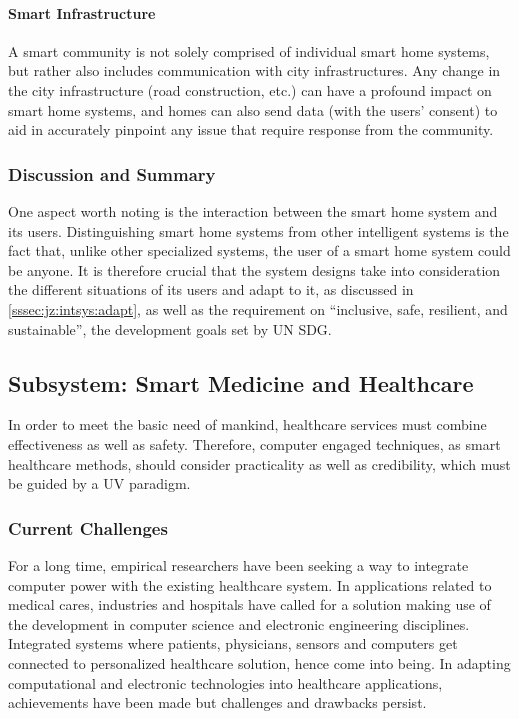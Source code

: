 \documentclass[letterpaper, twocolumn, 10pt, conference]{IEEEtran}
\begin{document}
\paragraph{Smart Infrastructure}

A smart community is not solely comprised of individual smart home systems, but rather also includes communication with city infrastructures. Any change in the city infrastructure (road construction, etc.) can have a profound impact on smart home systems, and homes can also send data (with the users' consent) to aid in accurately pinpoint any issue that require response from the community.

\subsubsection{Discussion and Summary}
\label{sssec:zcy:smart_home:discussion}

One aspect worth noting is the interaction between the smart home system and its users. Distinguishing smart home systems from other intelligent systems is the fact that, unlike other specialized systems, the user of a smart home system could be anyone. It is therefore crucial that the system designs take into consideration the different situations of its users and adapt to it, as discussed in \ref{sssec:jz:intsys:adapt}, as well as the requirement on \enquote{inclusive, safe, resilient, and sustainable}, the development goals set by UN SDG.



\subsection{Subsystem: Smart Medicine and Healthcare}
\label{ssec:cgh:smart_health}

In order to meet the basic need of mankind, healthcare services must combine effectiveness as well as safety. Therefore, computer engaged techniques, as smart healthcare methods, should consider practicality as well as credibility, which must be guided by a UV paradigm. 


\subsubsection{Current Challenges}
\label{sssec:cgh:smart_health:challenges}

For a long time, empirical researchers have been seeking a way to integrate computer power with the existing healthcare system. In applications related to medical cares, industries and hospitals have called for a solution making use of the development in computer science and electronic engineering disciplines. Integrated systems where patients, physicians, sensors and computers get connected to personalized healthcare solution, hence come into being. In adapting computational and electronic technologies into healthcare applications, achievements have been made but challenges and drawbacks persist.
\end{document}
